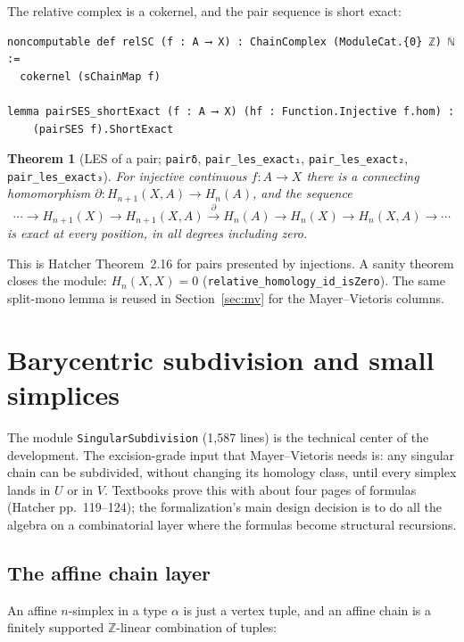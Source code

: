 \documentclass[11pt]{article}
\newtheorem{theorem}{Theorem}[section]
\theoremstyle{remark}
\newcommand{\Z}{\mathbb{Z}}
\newcommand{\leanname}[1]{\texttt{#1}}
\begin{document}
The relative complex is a cokernel, and the pair sequence is short exact:

\begin{lstlisting}
noncomputable def relSC (f : A ⟶ X) : ChainComplex (ModuleCat.{0} ℤ) ℕ :=
  cokernel (sChainMap f)

lemma pairSES_shortExact (f : A ⟶ X) (hf : Function.Injective f.hom) :
    (pairSES f).ShortExact
\end{lstlisting}

\begin{theorem}[LES of a pair; \leanname{pairδ},
\leanname{pair\_les\_exact₁}, \leanname{pair\_les\_exact₂},
\leanname{pair\_les\_exact₃}]\label{thm:les}
For injective continuous $f : A \to X$ there is a connecting homomorphism
$\partial : H_{n+1}(X, A) \to H_n(A)$, and the sequence
\[
\cdots \to H_{n+1}(X) \to H_{n+1}(X, A) \xrightarrow{\ \partial\ }
H_n(A) \to H_n(X) \to H_n(X, A) \to \cdots
\]
is exact at every position, in all degrees including zero.
\end{theorem}

This is Hatcher Theorem~2.16 for pairs presented by injections. A sanity
theorem closes the module: $H_n(X, X) = 0$
(\leanname{relative\_homology\_id\_isZero}). The same split-mono lemma is
reused in Section~\ref{sec:mv} for the Mayer--Vietoris columns.

\section{Barycentric subdivision and small simplices}\label{sec:subdivision}

The module \leanname{SingularSubdivision} (1{,}587 lines) is the technical
center of the development. The excision-grade input that Mayer--Vietoris
needs is: any singular chain can be subdivided, without changing its
homology class, until every simplex lands in $U$ or in $V$. Textbooks prove
this with about four pages of formulas (Hatcher pp.~119--124); the
formalization's main design decision is to do all the algebra on a
combinatorial layer where the formulas become structural recursions.

\subsection{The affine chain layer}

An affine $n$-simplex in a type $\alpha$ is just a vertex tuple, and an
affine chain is a finitely supported $\Z$-linear combination of tuples:
\end{document}
